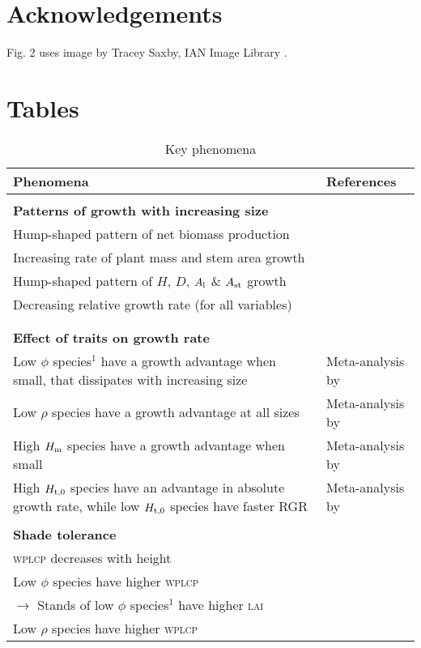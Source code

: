 \documentclass[a4paper,11pt]{article}
\begin{document}
\section{Acknowledgements}

Fig. 2 uses image by Tracey Saxby, IAN Image Library .

\newpage

\section{Tables}

\begin{table}[ht]
\caption{Key phenomena}
{\footnotesize
{\centering
  \begin{tabular}{p{9cm}p{6cm}}
  \\
  \hline
  Phenomena & References \\
  \hline

  \\\multicolumn{2}{l}{\bf{Patterns of growth with increasing size}}\\
  Hump-shaped pattern of net biomass production & \citet{Givnish-1988, Koch-2004} \\
  Increasing rate of plant mass and stem area growth & \citet{Stephenson-2014} \\
  Hump-shaped pattern of $H$, $D$, $A_{\rm l}$ \& $A_{\rm st}$ growth& \citet{King-2005, Ryan-2006, Sillett-2010, Herault-2011, King-2011} \\
  Decreasing relative growth rate (for all variables) & \citet{Rees-2010, Iida-2014}\\
  \\
  \\ \multicolumn{2}{l}{\bf{Effect of traits on growth rate}}\\
  Low $\phi$ species$^1$  have a growth advantage when small, that dissipates with increasing size & Meta-analysis by \citet{Gibert-2016}\\
  Low $\rho$ species have a growth advantage at all sizes & Meta-analysis by \citet{Gibert-2016}\\
  High $H_{\rm m}$ species have a growth advantage when small & Meta-analysis by \citet{Gibert-2016}\\
  High $H_{\rm t,0}$ species have an advantage in absolute growth rate, while low $H_{\rm t,0}$ species have faster RGR & Meta-analysis by \citet{Gibert-2016}\\

  \\ \multicolumn{2}{l}{\bf{Shade tolerance}}\\
  \textsc{wplcp} decreases with height & \citet{Givnish-1988}\\
  Low $\phi$ species have higher \textsc{wplcp} & \citet{Poorter-2006, Lusk-2008}\\
  \quad $\rightarrow$ Stands of low $\phi$ species$^1$  have higher \textsc{lai} &  \citet{Reich-1992, Gower-1993, Niinemets-2010} \\
  Low $\rho$ species have higher \textsc{wplcp} &  \citet{Osunkoya-1996}\\


\end{tabular}}}
\end{table}
\end{document}
